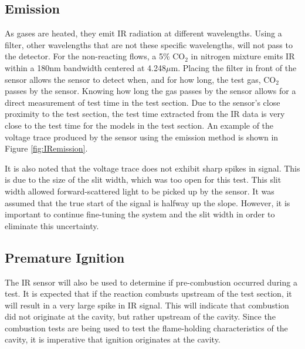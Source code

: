 
\subsection{Emission}

As gases are heated, they emit IR radiation at different wavelengths. Using a filter, other wavelengths that are not these specific wavelengths, will not pass to the detector. For the non-reacting flows, a 5\% CO$_2$ in nitrogen mixture emits IR within a 180nm bandwidth centered at 4.248$\mu$m. Placing the filter in front of the sensor allows the sensor to detect when, and for how long, the test gas, CO$_2$ passes by the sensor. Knowing how long the gas passes by the sensor allows for a direct measurement of test time in the test section. Due to the sensor's close proximity to the test section, the test time extracted from the IR data is very close to the test time for the models in the test section. An example of the voltage trace produced by the sensor using the emission method is shown in Figure \ref{fig:IRemission}. 



It is also noted that the voltage trace does not exhibit sharp spikes in signal. This is due to the size of the slit width, which was too open for this test. This slit width allowed forward-scattered light to be picked up by the sensor. It was assumed that the true start of the signal is halfway up the slope. However, it is important to continue fine-tuning the system and the slit width in order to eliminate this uncertainty.

\subsection{Premature Ignition}

The IR sensor will also be used to determine if pre-combustion occurred during a test. It is expected that if the reaction combusts upstream of the test section, it will result in a very large spike in IR signal. This will indicate that combustion did not originate at the cavity, but rather upstream of the cavity. Since the combustion tests are being used to test the flame-holding characteristics of the cavity, it is imperative that ignition originates at the cavity. 



